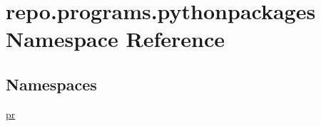 \hypertarget{namespacerepo_1_1programs_1_1pythonpackages}{\section{repo.\-programs.\-pythonpackages Namespace Reference}
\label{namespacerepo_1_1programs_1_1pythonpackages}
}
\subsection*{Namespaces}
\begin{DoxyCompactItemize}
\item 
\hyperlink{namespacerepo_1_1programs_1_1pythonpackages_1_1pr}{pr}
\end{DoxyCompactItemize}
